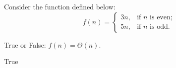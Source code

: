 \begin{prob}
    Consider the function defined below:
    \[
        f(n) =
        \begin{cases}
            3n, & \text{if $n$ is even;}\\
            5n ,& \text{if $n$ is odd.}
        \end{cases}
    \]

    True or False: $f(n) = \Theta(n)$.

    \Tf{}

    \begin{soln}
        True
    \end{soln}

\end{prob}
